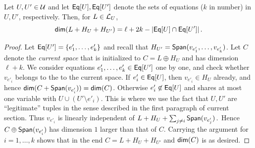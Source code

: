 \documentclass{toc}
\newcommand*\xor{\mathbin{\oplus}}
\begin{document}
\begin{lemma}\label{lem:intuition_aux1} Let $U, U' \in {\cal U}$ and
let  %
${\sf Eq}[U], {\sf Eq}[U']$ denote the sets of equations ($k$ in number)
in $U, U'$, respectively.  %
%
Then, for
$L \in {\cal L}_U$, $$ {\sf dim} (L + H_U + H_{U'}) = \ell + 2k  - |{\sf Eq}[U] \cap {\sf Eq}[U']|\,.$$%
\end{lemma}
\begin{proof}Let ${\sf Eq}[U'] = \{ e'_1, \ldots, e'_k \}$ and recall that $H_{U'} = {\sf Span}(v_{e'_1},\ldots,v_{e'_k} )$.
Let $C$ denote the %
\emph{current space}  %
that is initialized to  $C = L \xor H_U$ and has
dimension $\ell+k$. We consider
equations $e'_1, \ldots, e'_k  \in {\sf Eq}[U']$ one by one,
and check whether %
%
%
%
%
%
%
%
%
%
$v_{e'_i}$  
belongs to the   %
%
%
%
to the current space.
%
If %
$e'_i \in {\sf Eq}[U]$, then $v_{e'_i} \in H_U$ already,
and hence ${\sf dim} (C + {\sf Span}(v_{e'_i}))= {\sf dim}(C)$.
Otherwise $e'_i \not\in {\sf Eq}[U]$ and shares at most one variable with $U \cup (U' \setminus e'_i)$. This is where we use the fact that $U, U'$ are ``legitimate''
tuples in the sense described in the first paragraph of current section.
Thus $v_{e'_i}$ is linearly independent of
%
$L + H_U +\sum_{j \neq  i} {\sf Span}( v_{e'_j} )\,.$ %
%
Hence $C \xor  {\sf Span}(v_{e'_i})$ has dimension $1$ larger than that of $C$. Carrying the
argument for $i=1,\ldots,k$ shows that in the end $C = L + H_U +H_{U'}$ and ${\sf dim}(C)$ is as desired.
\end{proof}

%
%
%
%
%
\end{document}
